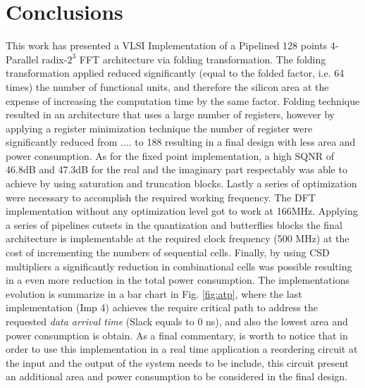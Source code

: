 \documentclass[10pt,times,mathptm,psfig,final,journal,comsoc]{IEEEtran}
\begin{document}

%


	



\section{Conclusions} \label{sec:conclusions}
This work has presented a VLSI Implementation of a Pipelined 128 points 4-Parallel radix-$2^3$ FFT architecture via folding transformation.
The folding transformation applied reduced significantly (equal to the folded factor, i.e. 64 times) the number of functional units, and therefore the silicon area at the expense of increasing the computation time by the same factor.
Folding technique resulted in an architecture that uses a large number of registers, however by applying a register minimization technique the number of register were significantly reduced from .... to 188 resulting in a final design with less area and power consumption. As for the fixed point implementation, a high SQNR of 46.8dB and 47.3dB for the real and the imaginary part respectably was able to achieve by using saturation and truncation blocks. 
Lastly a series of optimization were necessary to accomplish the required working frequency. The DFT implementation without any optimization level got to work at 166MHz. Applying a series of pipelines cutsets in the quantization and butterflies blocks the final architecture is implementable at the required clock frequency (500 MHz) at the cost of incrementing the numbers of sequential cells. Finally, by using CSD multipliers a significantly reduction in combinational cells was possible resulting in a even more reduction in the total power consumption. 
The  implementations evolution is summarize in a bar chart in Fig. \ref{fig:atp}, where the last implementation (Imp 4) achieves the require critical path to address the requested \textit{data arrival time} (Slack equals to 0 ns), and also the lowest area and power consumption is obtain.
As a final commentary, is worth to notice that in order to use this implementation in a real time application a reordering circuit at the input and the output of the system needs to be include, this circuit present an additional area and power consumption to be considered in the final design. 
\end{document}
